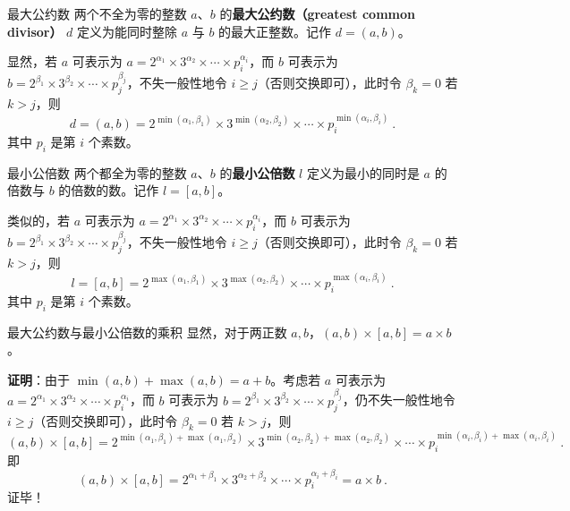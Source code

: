 
\begin{definition}{最大公约数}
两个不全为零的整数 $a$、$b$ 的\textbf{最大公约数（greatest common divisor）} $d$ 定义为能同时整除 $a$ 与 $b$ 的最大正整数。记作 $d = (a, b)$。
\end{definition}
显然，若 $a$ 可表示为 $a = 2^{\alpha_1} \times 3^{\alpha_2} \times \cdots \times p_i^{\alpha_i}$，而 $b$ 可表示为 $b = 2^{\beta_1} \times 3^{\beta_2} \times \cdots \times p_j^{\beta_j}$，不失一般性地令 $i \ge j$（否则交换即可），此时令 $\beta_k = 0$ 若 $k > j$，则
\begin{equation}
d = (a, b) = 2^{\min(\alpha_1, \beta_1)} \times 3^{\min(\alpha_2, \beta_2)} \times \cdots \times p_i^{\min(\alpha_i, \beta_i)} ~.
\end{equation}
其中 $p_i$ 是第 $i$ 个素数。

\begin{definition}{最小公倍数}
两个都全为零的整数 $a$、$b$ 的\textbf{最小公倍数} $l$ 定义为最小的同时是 $a$ 的倍数与 $b$ 的倍数的数。记作 $l = [a, b]$。
\end{definition}
类似的，若 $a$ 可表示为 $a = 2^{\alpha_1} \times 3^{\alpha_2} \times \cdots \times p_i^{\alpha_i}$，而 $b$ 可表示为 $b = 2^{\beta_1} \times 3^{\beta_2} \times \cdots \times p_j^{\beta_j}$，不失一般性地令 $i \ge j$（否则交换即可），此时令 $\beta_k = 0$ 若 $k > j$，则
\begin{equation}
l = [a, b] = 2^{\max(\alpha_1, \beta_1)} \times 3^{\max(\alpha_2, \beta_2)} \times \cdots \times p_i^{\max(\alpha_i, \beta_i)} ~.
\end{equation}
其中 $p_i$ 是第 $i$ 个素数。

\begin{theorem}{最大公约数与最小公倍数的乘积}
显然，对于两正数 $a, b$，$(a, b) \times [a, b] = a \times b$。
\end{theorem}
\textbf{证明}：由于 $\min(a, b) + \max(a, b) =a + b$。考虑若 $a$ 可表示为 $a = 2^{\alpha_1} \times 3^{\alpha_2} \times \cdots \times p_i^{\alpha_i}$，而 $b$ 可表示为 $b = 2^{\beta_1} \times 3^{\beta_2} \times \cdots \times p_j^{\beta_j}$，仍不失一般性地令 $i \ge j$（否则交换即可），此时令 $\beta_k = 0$ 若 $k > j$，则
\begin{equation}
(a, b) \times  [a, b] = 2^{\min(\alpha_1, \beta_1) + \max(\alpha_1, \beta_2)} \times 3^{\min(\alpha_2, \beta_2) + \max(\alpha_2, \beta_2)} \times \cdots \times p_i^{\min(\alpha_i, \beta_i) + \max(\alpha_i, \beta_i)} ~.
\end{equation}
即
\begin{equation}
(a,b) \times [a, b] = 2^{\alpha_1 + \beta_1} \times 3^{\alpha_2 + \beta_2} \times \cdots \times p_i^{\alpha_i + \beta_i} = a \times b ~.
\end{equation}
证毕！
